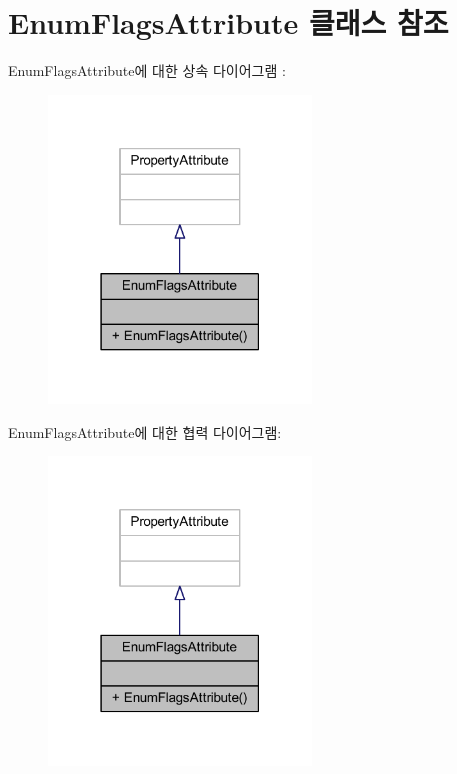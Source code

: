 \hypertarget{class_enum_flags_attribute}{}\section{Enum\+Flags\+Attribute 클래스 참조}
\label{class_enum_flags_attribute}


Enum\+Flags\+Attribute에 대한 상속 다이어그램 \+: \nopagebreak
\begin{figure}[H]
\begin{center}
\leavevmode
\includegraphics[width=198pt]{dc/dcf/class_enum_flags_attribute__inherit__graph}
\end{center}
\end{figure}


Enum\+Flags\+Attribute에 대한 협력 다이어그램\+:\nopagebreak
\begin{figure}[H]
\begin{center}
\leavevmode
\includegraphics[width=198pt]{d2/d34/class_enum_flags_attribute__coll__graph}
\end{center}
\end{figure}

